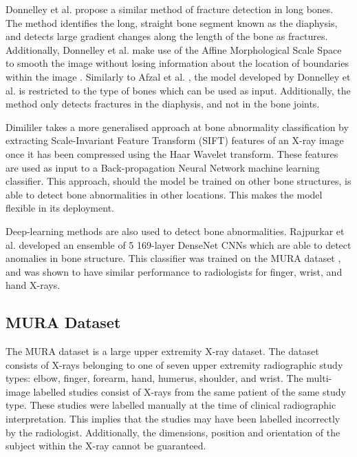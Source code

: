 \documentclass{IEEEtran}
\begin{document}
	Donnelley et al. \cite{donnelleyandknowles} propose a similar method of fracture detection in long bones. The method identifies the long, straight bone segment known as the diaphysis, and detects large gradient changes along the length of the bone as fractures. Additionally, Donnelley et al. make use of the Affine Morphological Scale Space to smooth the image without losing information about the location of boundaries within the image \cite{donnelleyandknowles,amss}. Similarly to Afzal et al. \cite{mashalafzalmmoazzamjawaidrizwanbadarbalochsanamnarejo2020}, the model developed by Donnelley et al. \cite{donnelleyandknowles} is restricted to the type of bones which can be used as input. Additionally, the method only detects fractures in the diaphysis, and not in the bone joints.
	
	Dimililer \cite{DIMILILER2017260} takes a more generalised approach at bone abnormality classification by extracting Scale-Invariant Feature Transform (SIFT) \cite{lowe2004distinctive} features of an X-ray image once it has been compressed using the Haar Wavelet transform. These features are used as input to a Back-propagation Neural Network machine learning classifier. This approach, should the model be trained on other bone structures, is able to detect bone abnormalities in other locations. This makes the model flexible in its deployment.
	
	Deep-learning methods are also used to detect bone abnormalities. Rajpurkar et al. \cite{rajpurkar2017mura} developed an ensemble of 5 169-layer DenseNet CNNs which are able to detect anomalies in bone structure. This classifier was trained on the MURA dataset \cite{rajpurkar2017mura}, and was shown to have similar performance to radiologists for finger, wrist, and hand X-rays.
	
	\subsection{MURA Dataset}
	
	The MURA dataset \cite{rajpurkar2017mura} is a large upper extremity X-ray dataset. The dataset consists of X-rays belonging to one of seven upper extremity radiographic study types: elbow, finger, forearm, hand, humerus, shoulder, and wrist. The multi-image labelled studies consist of X-rays from the same patient of the same study type. These studies were labelled manually at the time of clinical radiographic interpretation. This implies that the studies may have been labelled incorrectly by the radiologist. Additionally, the dimensions, position and orientation of the subject within the X-ray cannot be guaranteed. 
	
\end{document}
